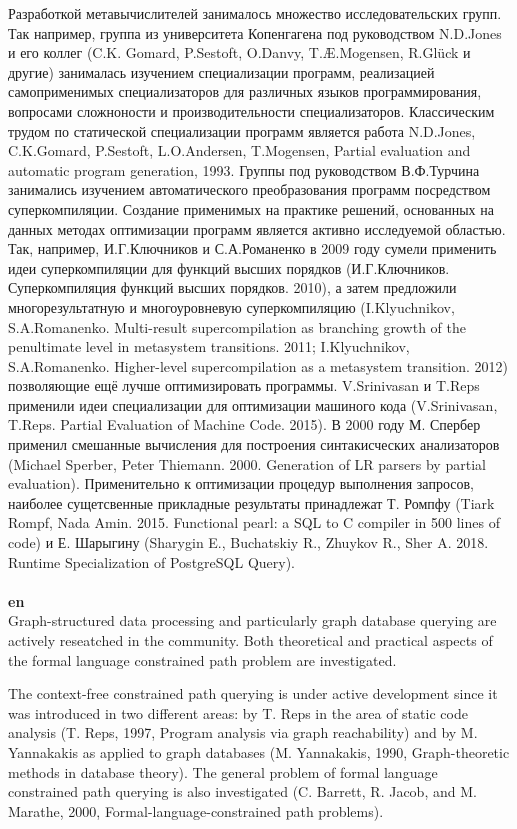 \documentclass[12pt]{article}  %
\theoremstyle{remark}
\begin{document}
Разработкой метавычислителей занималось множество исследовательских групп.
Так например, группа из университета Копенгагена под руководством N.D.Jones и его коллег (C.K. Gomard, P.Sestoft, O.Danvy, T.Æ.Mogensen, R.Glück и другие) занималась изучением специализации программ, реализацией самоприменимых специализаторов для различных языков программирования, вопросами сложноности и производительности специализаторов.
Классическим трудом по статической специализации программ является работа N.D.Jones, C.K.Gomard, P.Sestoft, L.O.Andersen, T.Mogensen,
Partial evaluation and automatic program generation, 1993.
Группы под руководством В.Ф.Турчина занимались изучением автоматического преобразования программ посредством суперкомпиляции.
Создание применимых на практике решений, основанных на данных методах оптимизации программ является активно исследуемой областью.
Так, например, И.Г.Ключников и С.А.Романенко в 2009 году сумели применить идеи суперкомпиляции для функций высших порядков (И.Г.Ключников. Суперкомпиляция функций высших порядков. 2010),
а затем предложили многорезультатную и многоуровневую суперкомпиляцию
(I.Klyuchnikov, S.A.Romanenko. Multi-result supercompilation as branching growth of the penultimate level in metasystem transitions. 2011; I.Klyuchnikov, S.A.Romanenko. Higher-level supercompilation as a metasystem transition. 2012) позволяющие ещё лучше оптимизировать программы.
V.Srinivasan и T.Reps применили идеи специализации для оптимизации машиного кода (V.Srinivasan, T.Reps. Partial Evaluation of Machine Code. 2015).
В 2000 году М. Спербер применил смешанные вычисления для построения синтакисческих анализаторов (Michael Sperber, Peter Thiemann. 2000. Generation of LR parsers by partial evaluation).
Применительно к оптимизации процедур выполнения запросов, наиболее сущетсвенные прикладные результаты принадлежат Т. Ромпфу (Tiark Rompf, Nada Amin. 2015. Functional pearl: a SQL to C compiler in 500 lines of code) и Е. Шарыгину (Sharygin E., Buchatskiy R., Zhuykov R., Sher A. 2018. Runtime Specialization of PostgreSQL Query).
\\
\\
\textbf{en}\\

Graph-structured data processing and particularly graph database querying are actively reseatched in the community.
Both theoretical and practical aspects of the formal language constrained path problem are investigated.

The context-free constrained path querying is under active development since it was introduced in two different areas: by T. Reps in the area of static code analysis (T. Reps, 1997, Program analysis via graph reachability) and by M. Yannakakis as applied to graph databases (M. Yannakakis, 1990, Graph-theoretic methods in database theory).
The general problem of formal language constrained path querying is also investigated (C. Barrett, R. Jacob, and M. Marathe, 2000, Formal-language-constrained path problems).
\end{document}
